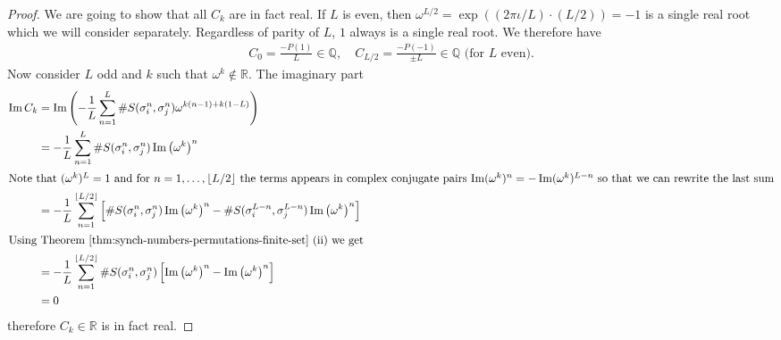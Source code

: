 \documentclass[oneside]{amsart}
\def\Q{\mathbb{Q}}
\def\R{\mathbb{R}}
\def\Im{\operatorname{Im}}
\begin{document}
\begin{proof}
  We are going to show that all $C_k$ are in fact real.
  If $L$ is even, then $\omega^{L/2} = \exp((2\pi\iota/L) \cdot (L/2)) = -1$
  is a single real root which we will consider separately.
  Regardless of parity of $L$, $1$ always is a single real root.
  We therefore have
  \begin{align*}
    C_0 = \frac{-P(1)}{L} \in \Q, \quad C_{L/2} = \frac{-P(-1)}{\pm L} \in \Q \text{ (for $L$ even)}.
  \end{align*}
  Now consider $L$ odd and $k$ such that $\omega^k \notin \R$. The imaginary part
  \begin{align*}
    \Im C_k &= \Im \left( -\frac{1}{L} \sum_{n=1}^L \#S(\sigma_i^n,\sigma_j^n) \omega^{k(n-1)+k(1-L)} \right) \\
    &= -\frac{1}{L} \sum_{n=1}^L \#S(\sigma_i^n,\sigma_j^n) \Im \left(\omega^{k}\right)^n \\
  \intertext{Note that $(\omega^k)^L=1$ and for $n=1,\ldots,\lfloor L/2 \rfloor$ the terms appears in complex
      conjugate pairs $\Im(\omega^{k})^n = -\Im(\omega^{k})^{L-n}$ so that we can rewrite the last sum}
    &= -\frac{1}{L} \sum_{n=1}^{\lfloor L/2 \rfloor} \left[\#S(\sigma_i^n,\sigma_j^n)
      \Im \left(\omega^{k}\right)^n - \#S(\sigma_i^{L-n},\sigma_j^{L-n}) \Im \left(\omega^{k}\right)^n \right] \\
  \intertext{Using Theorem~\ref{thm:synch-numbers-permutations-finite-set} (ii) we get}
    &= -\frac{1}{L} \sum_{n=1}^{\lfloor L/2 \rfloor} \#S(\sigma_i^n,\sigma_j^n)
      \left[ \Im\left(\omega^k\right)^n - \Im\left(\omega^k\right)^n \right] \\
    &= 0
  \end{align*}
  therefore $C_k \in \R$ is in fact real.


\end{proof}
\end{document}
